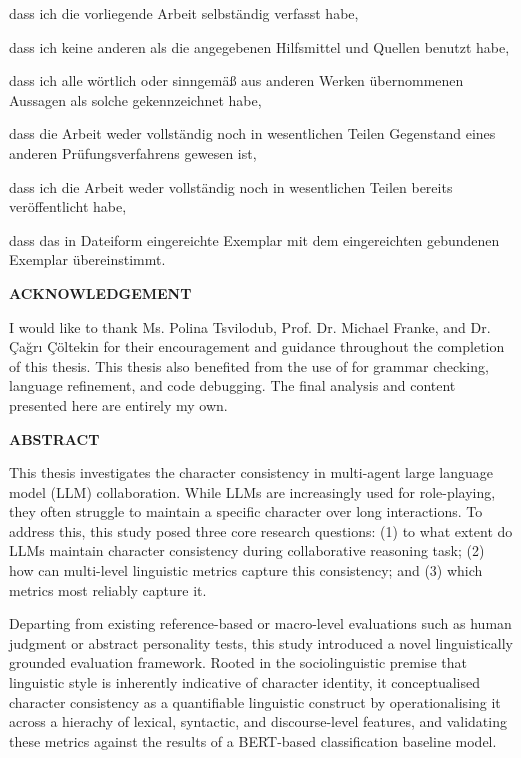 \documentclass{article}
\begin{document}
dass ich die vorliegende Arbeit selbständig verfasst habe,

dass ich keine anderen als die angegebenen Hilfsmittel und Quellen benutzt habe,

dass ich alle wörtlich oder sinngemäß aus anderen Werken übernommenen Aussagen als solche gekennzeichnet habe,

dass die Arbeit weder vollständig noch in wesentlichen Teilen Gegenstand eines anderen Prüfungsverfahrens gewesen ist,

dass ich die Arbeit weder vollständig noch in wesentlichen Teilen bereits veröffentlicht habe,

dass das in Dateiform eingereichte Exemplar mit dem eingereichten gebundenen Exemplar übereinstimmt.





\newpage

\begin{center}
  \normalsize\bfseries\MakeUppercase{acknowledgement}
\end{center}
I would like to thank Ms. Polina Tsvilodub, Prof. Dr. Michael Franke, and Dr. Çağrı Çöltekin for their encouragement and guidance throughout the completion of this thesis.
This thesis also benefited from the use of \citet{PerplexityAI2026} for grammar checking, language refinement, and code debugging. The final analysis and content presented here are entirely my own.





\newpage

\begin{center}
  \normalsize\bfseries\MakeUppercase{abstract}
\end{center}

This thesis investigates the character consistency in multi-agent large language model (LLM) collaboration. While LLMs are increasingly used for role-playing, they often struggle to maintain a specific character over long interactions. To address this, this study posed three core research questions: (1) to what extent do LLMs maintain character consistency during collaborative reasoning task; (2) how can multi-level linguistic metrics capture this consistency; and (3) which metrics most reliably capture it. 

Departing from existing reference-based or macro-level evaluations such as human judgment or abstract personality tests, this study introduced a novel linguistically grounded evaluation framework. Rooted in the sociolinguistic premise that linguistic style is inherently indicative of character identity, it conceptualised character consistency as a quantifiable linguistic construct by operationalising it across a hierachy of lexical, syntactic, and discourse-level features, and validating these metrics against the results of a BERT-based classification baseline model.
\end{document}
